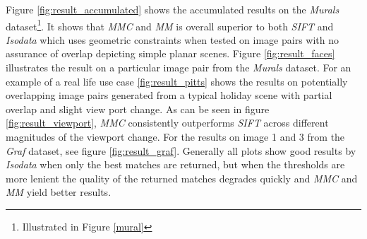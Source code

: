 \documentclass[12pt,journal,compsoc]{IEEEtran}
\begin{document}
%
%
Figure \ref{fig:result_accumulated} shows the accumulated results on the 
\emph{Murals} dataset\footnote{Illustrated in Figure \ref{mural}}. It 
shows that \emph{MMC} and \emph{MM} is overall superior to both 
\emph{SIFT} and \emph{Isodata} which uses geometric constraints when 
tested on image pairs with no assurance of overlap depicting simple 
planar scenes. Figure \ref{fig:result_faces} illustrates the result on a 
particular image pair from the \emph{Murals} dataset. For an example of 
a real life use case \ref{fig:result_pitts} shows the results on 
potentially overlapping image pairs generated from a typical holiday 
scene with partial overlap and slight view port change. As can be seen 
in figure \ref{fig:result_viewport}, \emph{MMC} consistently outperforms 
\emph{SIFT} across different magnitudes of the viewport change. For the 
results on image 1 and 3 from the \emph{Graf} dataset, see figure 
\ref{fig:result_graf}.
Generally all plots show good results by \emph{Isodata} when only the 
best matches are returned, but when the thresholds are more lenient the 
quality of the returned matches degrades quickly and \emph{MMC} and 
\emph{MM} yield better results.
\end{document}
